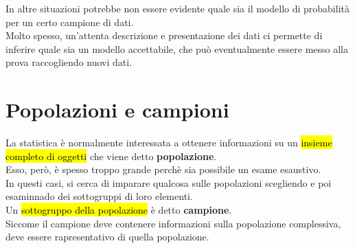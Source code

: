 In altre situazioni potrebbe non essere evidente quale sia il modello di probabilità per un certo campione di dati.\\[0.2ex]
Molto spesso, un'attenta descrizione e presentazione dei dati ci permette di inferire quale sia un modello accettabile, che può eventualmente essere messo alla prova raccogliendo nuovi dati.

\section{Popolazioni e campioni}
La statistica è normalmente interessata a ottenere informazioni su un \hl{insieme completo di oggetti} che viene detto \textbf{popolazione}.\\[0.2ex]
Esso, però, è spesso troppo grande perchè sia possibile un esame esaustivo.\\[0.2ex]
In questi casi, si cerca di imparare qualcosa sulle popolazioni scegliendo e poi esaminnado dei sottogruppi di loro elementi.\\[0.2ex]
Un \hl{sottogruppo della popolazione} è detto \textbf{campione}.\\[0.2ex]
Siccome il campione deve contenere informazioni sulla popolazione complessiva, deve essere rapresentativo di quella popolazione.

